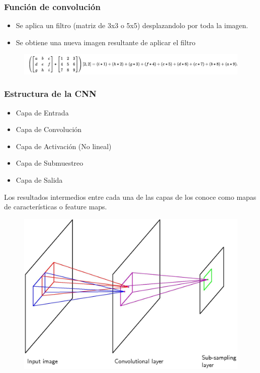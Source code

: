 \documentclass[10pt,center]{beamer}
\begin{document}
\begin{frame}
  \frametitle{Función de convolución}
  \begin{itemize}
    \item Se aplica un filtro (matriz de 3x3 o 5x5) desplazandolo por toda la imagen.
    \item Se obtiene una nueva imagen resultante de aplicar el filtro
  \end{itemize}
  \begin{figure}[h]
    \begin{center}
    \includegraphics[width=\textwidth]{./img/convolution_wiki.jpg}
    \end{center}
  \end{figure}
\end{frame}
  
\begin{frame}
  \frametitle{Estructura de la CNN}
    \begin{itemize}
     \item Capa de Entrada
     \item Capa de Convolución
     \item Capa de Activación (No lineal)
     \item Capa de Submuestreo
     \item Capa de Salida
    \end{itemize}
  Los resultados intermedios entre cada una de las capas de los conoce como mapas de características o feature maps.
 
  \begin{figure}[h]
    \begin{center}
    \includegraphics[height=0.5\textheight]{./img/bishop_cnn.jpg}
    \end{center}
  \end{figure}
\end{frame}
\end{document}
